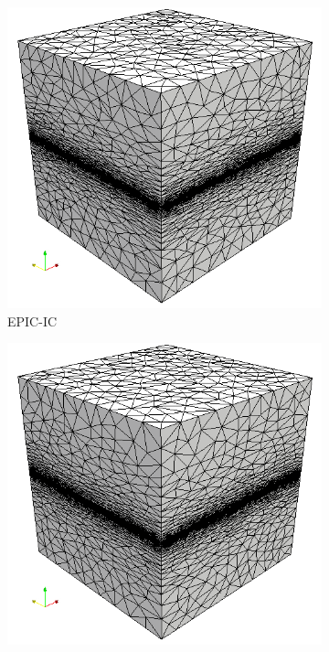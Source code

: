 \documentclass[3p,times,procedia,number]{elsarticle}
\begin{document}
\begin{figure}
\begin{subfigure}{.24\textwidth}
\centering
\includegraphics[width=\textwidth]{epic-ic-cube-linear.png}
\caption{EPIC-IC}
\end{subfigure}
\begin{subfigure}{.24\textwidth}
\centering
\includegraphics[width=\textwidth]{epic-ics-cube-linear.png}

\end{subfigure}
\end{figure}
\end{document}
